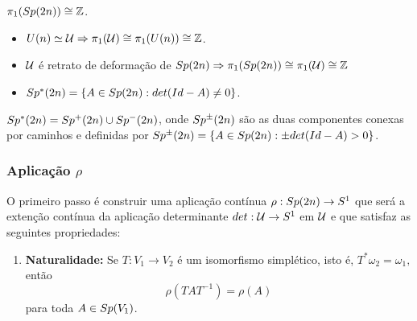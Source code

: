 \documentclass{beamer}
\begin{document}
\begin{footnotesize}
\begin{frame}
		\begin{teorema}
			$\pi_{1}(Sp(2n)) \cong \mathbb{Z}$.
			
		\end{teorema}
		\begin{prova}\begin{itemize}
				\item $U(n) \simeq \mathcal{U} \Rightarrow \pi_{1}(\mathcal{U}) \cong \pi_{1}(U(n)) \cong \mathbb{Z}$.
				
				\item $\mathcal{U}$ é retrato de deformação de $Sp(2n) \Rightarrow \pi_{1}(Sp(2n)) \cong \pi_{1}(\mathcal{U})\cong \mathbb{Z}$
				
			\end{itemize}
		\end{prova}
	
		\begin{itemize}
			\item $Sp^{*}(2n)=\{ A \in Sp(2n): det(Id-A)\neq 0 \}$.
		\end{itemize}
		
		\begin{lema}
			$Sp^{*}(2n) = Sp^{+}(2n)\cup Sp^{-}(2n)$, onde $Sp^{\pm}(2n)$ são as duas componentes conexas por caminhos e definidas por $
			Sp^{\pm}(2n) = \{ A \in Sp(2n): \pm det(Id-A)> 0 \}
			$.
		\end{lema}
		
		
	\end{frame}
	
	\begin{frame}
		\frametitle{Aplicação $\rho$}
		
		O primeiro passo é construir uma aplicação contínua $\rho: Sp(2n)\to S^{1}$ que será a extenção contínua da aplicação determinante $det:\mathcal{U}\to S^{1}$ em $\mathcal{U}$ e que satisfaz as seguintes propriedades:
		
		\begin{scriptsize}
			\begin{enumerate}
				\item \textbf{Naturalidade:}  Se $T:V_{1} \to V_{2}$ é um isomorfismo simplético, isto é, $T^{*}\omega_{2} = \omega_{1}, $então 
				$$
				\rho(TAT^{-1}) = \rho(A)
				$$
				para toda $A\in Sp(V_{1})$.
				

\end{enumerate}
\end{scriptsize}
\end{frame}
\end{footnotesize}
\end{document}
